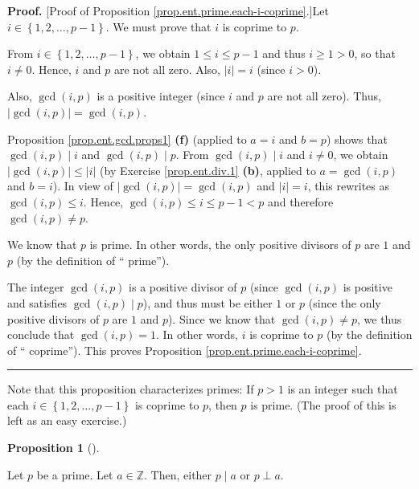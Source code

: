 \documentclass[numbers=enddot,12pt,final,onecolumn,notitlepage]{scrartcl}%
\newcounter{exer}
\numberwithin{exer}{subsection}
\theoremstyle{definition}
\newtheorem{prop}[theo]{Proposition}
\newenvironment{proposition}[1][]
{\begin{prop}[#1]\begin{leftbar}}
{\end{leftbar}\end{prop}}
\newenvironment{proof}[1][Proof]{\noindent\textbf{#1.} }{\ \rule{0.5em}{0.5em}}
\begin{document}
\begin{proof}
[Proof of Proposition \ref{prop.ent.prime.each-i-coprime}.]Let $i\in\left\{
1,2,\ldots,p-1\right\}  $. We must prove that $i$ is coprime to $p$.

From $i\in\left\{  1,2,\ldots,p-1\right\}  $, we obtain $1\leq i\leq p-1$ and
thus $i\geq1>0$, so that $i\neq0$. Hence, $i$ and $p$ are not all zero. Also,
$\left\vert i\right\vert =i$ (since $i>0$).

Also, $\gcd\left(  i,p\right)  $ is a positive integer (since $i$ and $p$ are
not all zero). Thus, $\left\vert \gcd\left(  i,p\right)  \right\vert
=\gcd\left(  i,p\right)  $.

Proposition \ref{prop.ent.gcd.props1} \textbf{(f)} (applied to $a=i$ and
$b=p$) shows that $\gcd\left(  i,p\right)  \mid i$ and $\gcd\left(
i,p\right)  \mid p$. From $\gcd\left(  i,p\right)  \mid i$ and $i\neq0$, we
obtain $\left\vert \gcd\left(  i,p\right)  \right\vert \leq\left\vert
i\right\vert $ (by Exercise \ref{prop.ent.div.1} \textbf{(b)}, applied to
$a=\gcd\left(  i,p\right)  $ and $b=i$). In view of $\left\vert \gcd\left(
i,p\right)  \right\vert =\gcd\left(  i,p\right)  $ and $\left\vert
i\right\vert =i$, this rewrites as $\gcd\left(  i,p\right)  \leq i$. Hence,
$\gcd\left(  i,p\right)  \leq i\leq p-1<p$ and therefore $\gcd\left(
i,p\right)  \neq p$.

We know that $p$ is prime. In other words, the only positive divisors of $p$
are $1$ and $p$ (by the definition of \textquotedblleft
prime\textquotedblright).

The integer $\gcd\left(  i,p\right)  $ is a positive divisor of $p$ (since
$\gcd\left(  i,p\right)  $ is positive and satisfies $\gcd\left(  i,p\right)
\mid p$), and thus must be either $1$ or $p$ (since the only positive divisors
of $p$ are $1$ and $p$). Since we know that $\gcd\left(  i,p\right)  \neq p$,
we thus conclude that $\gcd\left(  i,p\right)  =1$. In other words, $i$ is
coprime to $p$ (by the definition of \textquotedblleft
coprime\textquotedblright). This proves Proposition
\ref{prop.ent.prime.each-i-coprime}.
\end{proof}

Note that this proposition characterizes primes: If $p>1$ is an integer such
that each $i\in\left\{  1,2,\ldots,p-1\right\}  $ is coprime to $p$, then $p$
is prime. (The proof of this is left as an easy exercise.)

\begin{proposition}
\label{prop.ent.prime.div-or-coprime}Let $p$ be a prime. Let $a\in\mathbb{Z}$.
Then, either $p\mid a$ or $p\perp a$.
\end{proposition}
\end{document}
